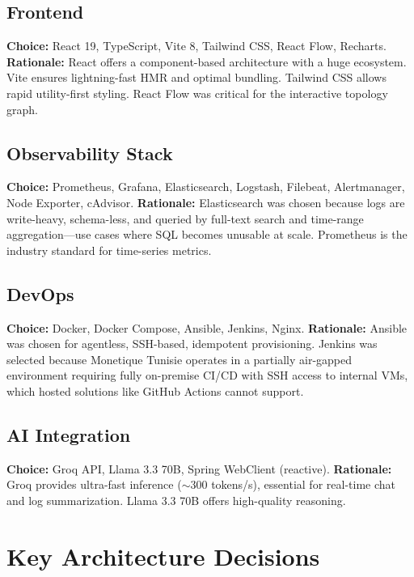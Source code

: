 \documentclass[12pt,a4paper]{report}
\begin{document}
\subsection{Frontend}
\textbf{Choice:} React 19, TypeScript, Vite 8, Tailwind CSS, React Flow, Recharts.
\newline
\textbf{Rationale:} React offers a component-based architecture with a huge ecosystem. Vite ensures lightning-fast HMR and optimal bundling. Tailwind CSS allows rapid utility-first styling. React Flow was critical for the interactive topology graph.

\subsection{Observability Stack}
\textbf{Choice:} Prometheus, Grafana, Elasticsearch, Logstash, Filebeat, Alertmanager, Node Exporter, cAdvisor.
\newline
\textbf{Rationale:} Elasticsearch was chosen because logs are write-heavy, schema-less, and queried by full-text search and time-range aggregation—use cases where SQL becomes unusable at scale. Prometheus is the industry standard for time-series metrics.

\subsection{DevOps}
\textbf{Choice:} Docker, Docker Compose, Ansible, Jenkins, Nginx.
\newline
\textbf{Rationale:} Ansible was chosen for agentless, SSH-based, idempotent provisioning. Jenkins was selected because Monetique Tunisie operates in a partially air-gapped environment requiring fully on-premise CI/CD with SSH access to internal VMs, which hosted solutions like GitHub Actions cannot support.

\subsection{AI Integration}
\textbf{Choice:} Groq API, Llama 3.3 70B, Spring WebClient (reactive).
\newline
\textbf{Rationale:} Groq provides ultra-fast inference ($\sim$300 tokens/s), essential for real-time chat and log summarization. Llama 3.3 70B offers high-quality reasoning.

\section{Key Architecture Decisions}
\end{document}

